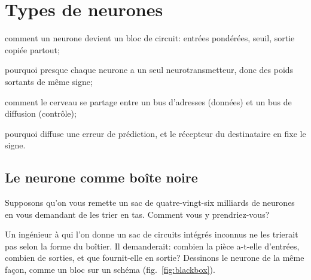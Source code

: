 \chapter{Types de neurones}
\label{sec:neurontypes}
\begin{chaptergoals}
\item comment un neurone devient un bloc de circuit: entrées pondérées, seuil, sortie copiée partout;
\item pourquoi presque chaque neurone a un seul neurotransmetteur, donc des poids sortants de même signe;
\item comment le cerveau se partage entre un bus d'adresses (données) et un bus de diffusion (contrôle);
\item pourquoi  diffuse une erreur de prédiction, et le récepteur du destinataire en fixe le signe.
\end{chaptergoals}

\section{Le neurone comme boîte noire}

Supposons qu'on vous remette un sac de quatre-vingt-six milliards de neurones~\cite{Azevedo2009} en vous demandant de les trier en tas. Comment vous y prendriez-vous?

Un ingénieur à qui l'on donne un sac de circuits intégrés inconnus ne les trierait pas selon la forme du boîtier. Il demanderait: combien la pièce a-t-elle d'entrées, combien de sorties, et que fournit-elle en sortie? Dessinons le neurone de la même façon, comme un bloc sur un schéma (fig.~\ref{fig:blackbox}).

